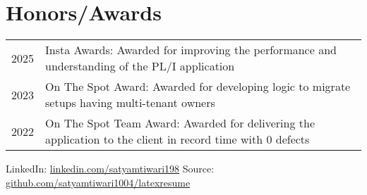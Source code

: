 \documentclass[10pt]{article}
\begin{document}

\vspace{0.75em}
\section{Honors/Awards}
\vspace{0.5em}
\begin{tabularx}{\textwidth}{r|X}
2025 & {Insta Awards: Awarded for improving the performance and understanding of the PL/I application} \\
2023 & {On The Spot Award: Awarded for developing logic to migrate setups having multi-tenant owners} \\
2022 & {On The Spot Team Award: Awarded for delivering the application to the client in record time with 0 defects} \\
\end{tabularx}


\null\vfill
\footnotesize{
  LinkedIn:  \href{https://www.linkedin.com/in/satyamtiwari198/}{linkedin.com/satyamtiwari198} \hfill
  Source:  \href{https://github.com/satyamtiwari1004/latexresume}{github.com/satyamtiwari1004/latexresume}
}
\end{document}
